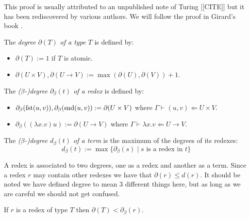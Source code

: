 This proof is usually attributed to an unpublished note of Turing [[CITE]] but it has been rediscovered by various authors. We will follow the proof in Girard's book \cite{Girard1989}.

\begin{defin}
    The \emph{degree $\partial(T)$ of a type $T$} is defined by:
    \begin{itemize}
        \item $\partial(T) := 1$ if $T$ is atomic.
        \item $\partial(U \times V), \partial(U \to V) := \max(\partial(U), \partial(V))+1$.
    \end{itemize}
\end{defin}

\begin{defin}
    The \emph{($\beta$-)degree $\partial_{\beta}(t)$ of a redex} is defined by:
    \begin{itemize}
        \item $\partial_{\beta}(\mathrm{fst}(u,v)), \partial_{\beta}(\mathrm{snd}(u,v)) := \partial(U\times V)$ where $\Gamma \vdash (u, v) \Leftarrow U \times V$.
        \item $\partial_{\beta}((\lambda x . v) u) := \partial(U \to V)$ where $\Gamma \vdash \lambda x . v \Leftarrow U \to V$.
    \end{itemize}
\end{defin}

\begin{defin}
    The \emph{($\beta$-)degree $d_{\beta}(t)$ of a term} is the maximum of the degrees of its redexes:
    $$
        d_{\beta}(t) := \max \{\partial_{\beta} (s) \mid s \text{ is a redex in } t\}
    $$
\end{defin}

\begin{remark}
    A redex is associated to two degrees, one as a redex and another as a term. Since a redex $r$ may contain other redexes we have that $\partial (r) \le d(r)$. It should be noted we have defined degree to mean 3 different things here, but as long as we are careful we should not get confused.
\end{remark}

\begin{lemma}\label{beta_redex_ineq}
    If $r$ is a redex of type $T$ then $\partial(T) < \partial_{\beta}(r)$. 
\end{lemma}

